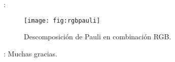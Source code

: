 \begin{frame}{\secname : \subsecname}
  \begin{figure}
    \centering
    \texttt{[image: fig:rgbpauli]}
    \caption{Descomposición de Pauli en combinación RGB.}
    \label{}
  \end{figure}
\end{frame}

\begin{frame}{\secname : \subsecname}
Muchas gracias.
\end{frame}
